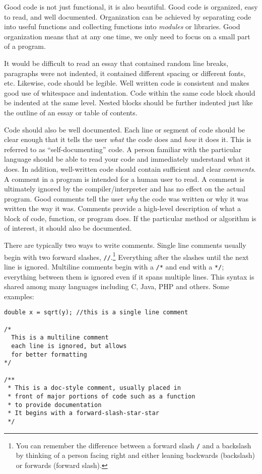 Good code is not just functional, it is also beautiful.  Good code
is organized, easy to read, and well documented.  Organization
can be achieved by separating code into useful functions and
collecting functions into \emph{modules} or libraries.  Good
organization means that at any one time, we only need to focus
on a small part of a program.  

It would be difficult to read an essay that contained
random line breaks, paragraphs were not indented, it contained
different spacing or different fonts, etc.  Likewise, code should be 
legible.  Well written code is consistent and makes good use
of whitespace and indentation.  Code within the same code block
should be indented at the same level.  Nested blocks should
be further indented just like the outline of an essay or table
of contents.

Code should also be well documented.  Each line or segment of
code should be
clear enough that it tells the user \emph{what} the code does
and \emph{how} it does it.  This is referred to as ``self-documenting''
code.  A person familiar with the particular language should be able 
to read your code and immediately understand what it does.
In addition, well-written code should contain sufficient and
clear \emph{comments}.  A comment in a program is intended for
a human user to read.  A comment is ultimately ignored by the
compiler/interpreter and
has no effect on the actual program.  Good comments tell the
user \emph{why} the code was written or why it was written
the way it was.  Comments provide a high-level description of
what a block of code, function, or program does.  If the 
particular method or algorithm is of interest, it should also be
documented.  

There are typically two ways to write comments.  Single line
comments usually begin with two forward slashes, 
\texttt{//}.\footnote{You can remember the difference
between a forward slash \texttt{/} and a backslash
\texttt{\ } by thinking of a person facing right and 
either leaning backwards (backslash) or forwards (forward slash).}
Everything after the slashes until the next line is ignored.  
Multiline comments begin with a \texttt{/*}
and end with a \texttt{*/}; everything between them 
is ignored even if it spans multiple lines.  This syntax is shared
among many languages including C, Java, PHP and others.
Some examples:

\begin{verbatim}
double x = sqrt(y); //this is a single line comment

/*
  This is a multiline comment
  each line is ignored, but allows
  for better formatting
*/

/**
 * This is a doc-style comment, usually placed in
 * front of major portions of code such as a function
 * to provide documentation
 * It begins with a forward-slash-star-star
 */
\end{verbatim}


